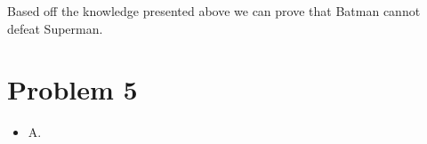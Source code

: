 \documentclass[10pt,a4paper]{article}
\begin{document}
\begin{enumerate}[A.]
	Based off the knowledge presented above we can prove that Batman cannot defeat Superman. 
	
	
	
		
		

	
	
	\end{enumerate}
	
	\section*{Problem 5}
	\begin{itemize}
		\item
		A.
	\end{itemize}
	
\end{document}
